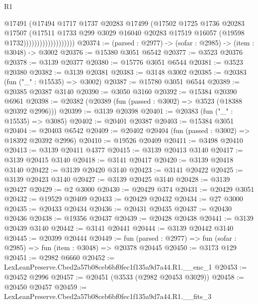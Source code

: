 \begin{lexlean}{R1}
\begin{coremodule}
                                  @17491
                                  (@17494
                                    @1717
                                    @1737
                                    @20283
                                    @17499
                                    (@17502
                                      @1725
                                      @1736
                                      @20283
                                      @17507
                                      (@17511
                                        @1733
                                        @299
                                        @3029
                                        @16040
                                        @20283
                                        @17519
                                        @16057
                                        (@19598 @1732)))))))))))))))))))
@20374 := (parsed : @2977) -> (sofar : @2985) -> (item : @3048) -> @3002
@20376 := @15380 @3051 @6542
@20377 := @3523 @20376
@20378 := @3139 @20377
@20380 := @15776 @3051 @6544
@20381 := @3523 @20380
@20382 := @3139 @20381
@20383 := @3148 @3002
@20385 := @20383 (fun ("_" : @15535) => @3002)
@20387 := @15780 @3051 @6544
@20389 := @20385 @20387 @3140
@20390 := @3050 @3160
@20392 := @15384 @20390 @6961
@20398 := @20382 (@20389 (fun (passed : @3002) => @3523 (@18388 @20392 @2996)))
@20399 := @3139 @20398
@20401 := @20383 (fun ("_" : @15535) => @3085)
@20402 := @20401 @20387
@20403 := @15384 @3051
@20404 := @20403 @6542
@20409 := @20402 @20404 (fun (passed : @3002) => @18392 @20392 @2996)
@20410 := @19526 @20409
@20411 := @3498 @20410
@20413 := @3139 @20411 @4377
@20415 := @3139 @20413 @3140
@20417 := @3139 @20415 @3140
@20418 := @3141 @20417
@20420 := @3139 @20418 @3140
@20422 := @3139 @20420 @3140
@20423 := @3141 @20422
@20425 := @3139 @20423 @3140
@20427 := @3139 @20425 @3140
@20428 := @3139 @20427
@20429 := @2 @3000
@20430 := @20429 @374
@20431 := @20429 @3051
@20432 := @19529 @20409
@20433 := @20429 @20432
@20434 := @27 @3000
@20435 := @20433 @20434
@20436 := @20431 @20435
@20437 := @20430 @20436
@20438 := @19356 @20437
@20439 := @20428 @20438
@20441 := @3139 @20439 @3140
@20442 := @3141 @20441
@20444 := @3139 @20442 @3140
@20445 := @20399 @20444
@20449 := fun (parsed : @2977) => fun (sofar : @2985) => fun (item : @3048) => @20378 @20445
@20450 := @3173 @129
@20451 := @2982 @6660
@20452 := LexLeanPreserve.Cbed2a57b08ceb6bf0fec1f135a9d7a44.R1.__enc_1
@20453 := @20452 @2996
@20457 := @20451 (@3533 (@2982 @20453 @3029))
@20458 := @20450 @20457
@20459 := LexLeanPreserve.Cbed2a57b08ceb6bf0fec1f135a9d7a44.R1.__fits_3

\end{coremodule}
\end{lexlean}
